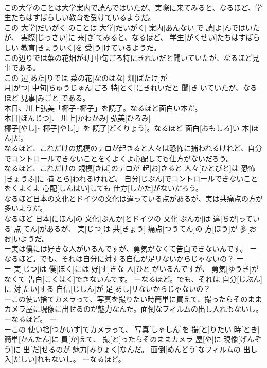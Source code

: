 \documentclass[8pt]{extreport}
\begin{document}
\begin{CJK}{UTF8}{min}
\\	この大学のことは大学案内で読んではいたが、実際に来てみると、なるほど、学生たちはすばらしい教育を受けているようだ。	
\\	この 大学[だいがく]のことは 大学[だいがく] 案内[あんない]で 読[よ]んではいたが、 実際[じっさい]に 来[き]てみると、なるほど、 学生[がくせい]たちはすばらしい 教育[きょういく]を 受[う]けているようだ。
\\	この辺りでは菜の花畑が4月中旬ごろ特にきれいだと聞いていたが、なるほど見事である。	
\\	この 辺[あた]りでは 菜の花[なのはな] 畑[ばたけ]が 
\\	月[がつ] 中旬[ちゅうじゅん]ごろ 特[とく]にきれいだと 聞[き]いていたが、なるほど 見事[みごと]である。
\\	本日、川上弘美「椰子･椰子」を読了。なるほど面白い本だ。	
\\	本日[ほんじつ]、 川上[かわかみ] 弘美[ひろみ]
\\	椰子[やし]･ 椰子[やし]」を 読了[どくりょう]。なるほど 面白[おもしろ]い 本[ほん]だ。
\\	なるほど、これだけの規模のテロが起きると人々は恐怖に捕われるけれど、自分でコントロールできないことをくよくよ心配しても仕方がないだろう。	
\\	なるほど、これだけの 規模[きぼ]のテロが 起[お]きると 人々[ひとびと]は 恐怖[きょうふ]に 捕[とら]われるけれど、 自分[じぶん]でコントロールできないことをくよくよ 心配[しんぱい]しても 仕方[しかた]がないだろう。
\\	なるほど日本の文化とドイツの文化は違っている点があるが、実は共痛点の方が多いようだ。	
\\	なるほど 日本[にほん]の 文化[ぶんか]とドイツの 文化[ぶんか]は 違[ちが]っている 点[てん]があるが、 実[じつ]は 共[きょう] 痛点[つうてん]の 方[ほう]が 多[おお]いようだ。
\\	ー実は僕には好きな人がいるんですが、勇気がなくて告白できないんです。 ーなるほど。でも、それは自分に対する自信が足リないからじゃないの？	ー
\\	ー 実[じつ]は 僕[ぼく]には 好[す]きな 人[ひと]がいるんですが、 勇気[ゆうき]がなくて 告白[こくはく]できないんです。 ーなるほど。でも、それは 自分[じぶん]に 対[たい]する 自信[じしん]が 足[あし]リないからじゃないの？
\\	ーこの使い捨てカメラって、写真を撮りたい時簡単に買えて、撮ったらそのままカメラ屋に現像に出せるのが魅力なんだ。面倒なフィルムの出し入れもないし。 ーなるほど。	ー
\\	ーこの 使い捨[つかいす]てカメラって、 写真[しゃしん]を 撮[と]りたい 時[とき] 簡単[かんたん]に 買[か]えて、 撮[と]ったらそのままカメラ 屋[や]に 現像[げんぞう]に 出[だ]せるのが 魅力[みりょく]なんだ。 面倒[めんどう]なフィルムの 出し入[だしい]れもないし。 ーなるほど。

\end{CJK}
\end{document}
